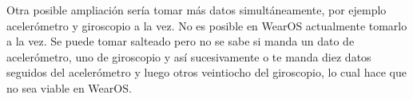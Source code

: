 \documentclass[12pt]{article}
\numberwithin{equation}{section}
\begin{document}
Otra posible ampliación sería tomar más datos simultáneamente, por ejemplo acelerómetro y giroscopio a la vez. No es posible en WearOS actualmente tomarlo a la vez. Se puede tomar salteado pero no se sabe si manda un dato de acelerómetro, uno de giroscopio y así sucesivamente o te manda diez datos seguidos del acelerómetro y luego otros veintiocho del giroscopio, lo cual hace que no sea viable en WearOS.




\newpage
\nocite{s150818901}
\nocite{Goodfellow-et-al-2016}
\nocite{wasserman}


\end{document}
